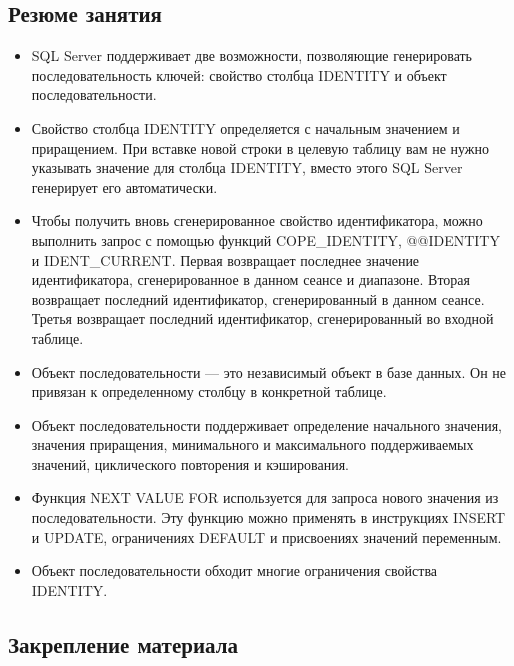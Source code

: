 \subsection*{Резюме занятия}
\begin{itemize}
	\item SQL Server поддерживает две возможности, позволяющие генерировать последовательность ключей: свойство столбца IDENTITY и объект последовательности. 
	\item Свойство столбца IDENTITY определяется с начальным значением и приращением. При вставке новой строки в целевую таблицу вам не нужно указывать
	значение для столбца IDENTITY, вместо этого SQL Server генерирует его автоматически.
	\item Чтобы получить вновь сгенерированное свойство идентификатора, можно выполнить запрос с помощью функций COPE\_IDENTITY, @@IDENTITY и IDENT\_CURRENT.
	Первая возвращает последнее значение идентификатора, сгенерированное
	в данном сеансе и диапазоне. Вторая возвращает последний идентификатор,
	сгенерированный в данном сеансе. Третья возвращает последний идентификатор, сгенерированный во входной таблице. 
	\item Объект последовательности — это независимый объект в базе данных. Он не
	привязан к определенному столбцу в конкретной таблице. 
	\item Объект последовательности поддерживает определение начального значения,
	значения приращения, минимального и максимального поддерживаемых значений, циклического повторения и кэширования. 
	\item Функция NEXT VALUE FOR используется для запроса нового значения из последовательности. Эту функцию можно применять в инструкциях INSERT и UPDATE,
	ограничениях DEFAULT и присвоениях значений переменным. 
	\item Объект последовательности обходит многие ограничения свойства IDENTITY. 
\end{itemize}

\subsection*{Закрепление материала}

